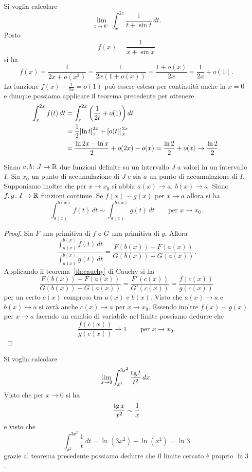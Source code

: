 \begin{example}
Si voglia calcolare
\[
  \lim_{x\to 0^+} \int_{x}^{2x} \frac{1}{t+\sin t}\, dt.
\]
Posto
\[
  f(x) = \frac{1}{x+\sin x}
\]
si ha
\[
 f(x)
  = \frac{1}{2x+o(x^2)} = \frac{1}{2x(1+o(x))}
  = \frac{1+o(x)}{2x} = \frac{1}{2x} + o(1).
\]
La funzione $f(x)-\frac 1{2x} = o(1)$
può essere estesa per continuità anche in $x=0$
e dunque possiamo applicare il teorema precedente
per ottenere
\begin{align*}
  \int_x^{2x} f(t)\, dt
  &= \int_x^{2x} {\left( \frac 1 {2t} + o(1) \right)}\, dt \\
  &= \frac 1 2 {\left[ \ln t \right]}_x^{2x} +  {\left[ o(t) \right]}_x^{2x} \\
  &= \frac {\ln 2x - \ln x} 2 + o(2x) - o(x)
  = \frac {\ln 2} 2 + o(x) \to \frac{\ln 2}{2}.
\end{align*}
\end{example}

\begin{theorem}
Siano $a,b\colon J \to {\mathbb R}$ due funzioni definite
su un intervallo $J$ a valori in un intervallo $I$.
Sia $x_0$ un punto di accumulazione di $J$ e sia $a$ un punto
di accumulazione di $I$. Supponiamo inoltre
che per $x\to x_0$ si abbia $a(x)\to a$, $b(x)\to a$.
Siano $f,g\colon I \to {\mathbb R}$ funzioni continue.
Se $f(x)\sim g(x)$ per $x\to a$ allora si ha
\[
  \int_{a(x)}^{b(x)} f(t)\, dt
  \sim \int_{a(x)}^{b(x)} g(t)\, dt
  \qquad \text{per $x\to x_0$}.
\]
\end{theorem}
%
\begin{proof}
Sia $F$ una primitiva di $f$ e $G$ una primitiva di $g$.
Allora
\[
  \frac{\displaystyle\int_{a(x)}^{b(x)}f(t)\, dt}{\displaystyle\int_{a(x)}^{b(x)} g(t)\, dt}
  = \frac{F(b(x)) - F(a(x))}{G(b(x))-G(a(x))}.
\]
Applicando il teorema~\ref{th:cauchy} di Cauchy si ha
\[
\frac{F(b(x)) - F(a(x))}{G(b(x))-G(a(x))}
= \frac{F'(c(x))}{G'(c(x))}
= \frac{f(c(x))}{g(c(x))}
\]
per un certo $c(x)$ compreso tra $a(x)$ e $b(x)$.
Visto che $a(x)\to a$ e $b(x)\to a$ si avrà anche $c(x)\to a$
per $x\to x_0$. Essendo inoltre $f(x)\sim g(x)$ per $x\to a$
facendo un cambio di variabile nel limite possiamo dedurre che
\[
\frac{f(c(x))}{g(c(x))} \to 1 \qquad \text{per $x\to x_0$}.
\]
\end{proof}

\begin{example}
Si voglia calcolare
\[
  \lim_{x\to 0 }\int_{x^2}^{3x^2} \frac{\operatorname{tg} t}{t^2}\, dx.
\]
Visto che per $x\to 0$ si ha
\[
  \frac{\operatorname{tg} x}{x^2} \sim \frac 1 x
\]
e visto che
\[
  \int_{x^2}^{3x^2}\frac{1}{t}\, dt
  = \ln(3x^2) - \ln(x^2) = \ln 3
\]
grazie al teorema precedente
possiamo dedurre che il limite cercato è proprio $\ln 3$.
\end{example}

